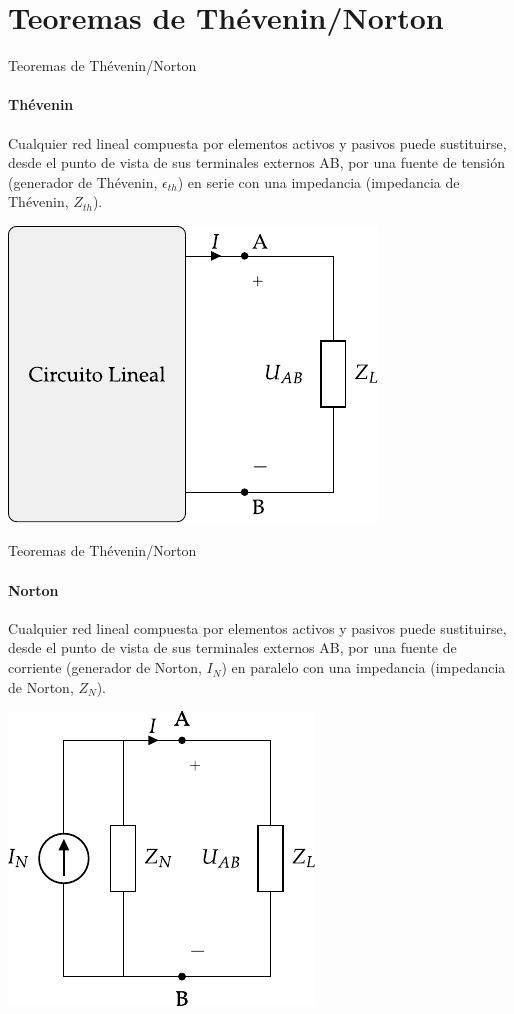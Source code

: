 \documentclass[aspectratio=169, usenames,svgnames,dvipsnames]{beamer}
\begin{document}
\section{Teoremas de Thévenin/Norton}
\label{sec:orged0d2f9}

\begin{frame}[label={sec:org147492a}]{Teoremas de Thévenin/Norton}
\framesubtitle{Thévenin}

Cualquier \alert{red lineal} compuesta por elementos activos y pasivos puede sustituirse, desde el punto de vista de sus terminales externos AB, por una \alert{fuente de tensión} (generador de Thévenin, \(\epsilon_{th}\)) en \alert{serie} con una impedancia (impedancia de Thévenin, \(Z_{th}\)).

\begin{center}
\includegraphics[height=0.6\textheight]{../figs/EquivalenteThevenin.pdf}
\end{center}
\end{frame}

\begin{frame}[label={sec:org309f167}]{Teoremas de Thévenin/Norton}
\framesubtitle{Norton}
Cualquier \alert{red lineal} compuesta por elementos activos y pasivos puede sustituirse, desde el punto de vista de sus terminales externos AB, por una \alert{fuente de corriente} (generador de Norton, \(I_N\)) en \alert{paralelo} con una impedancia (impedancia de Norton, \(Z_N\)).

\begin{center}
\includegraphics[height=0.6\textheight]{../figs/EquivalenteNorton.pdf}
\end{center}
\end{frame}
\end{document}
